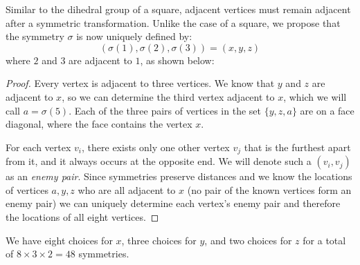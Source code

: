 \begin{sol}
    Similar to the dihedral group of a square, adjacent vertices must remain adjacent after a symmetric transformation. Unlike the case of a square, we propose that the symmetry $\sigma$ is now uniquely defined by:
    \begin{equation}
        (\sigma(1), \sigma(2), \sigma(3)) = (x,y,z)
    \end{equation}
    where $2$ and $3$ are adjacent to $1$, as shown below:
    \begin{center}
    \end{center}
    \begin{proof}
        Every vertex is adjacent to three vertices. We know that $y$ and $z$ are adjacent to $x$, so we can determine the third vertex adjacent to $x$, which we will call $a=\sigma(5)$. Each of the three pairs of vertices in the set $\{y,z,a\}$ are on a face diagonal, where the face contains the vertex $x$.
        \vspace{2mm}

        For each vertex $v_i$, there exists only one other vertex $v_j$ that is the furthest apart from it, and it always occurs at the opposite end. We will denote such a $(v_i,v_j)$ as an \textit{enemy pair}. Since symmetries preserve distances and we know the locations of vertices $a,y,z$ who are all adjacent to $x$ (no pair of the known vertices form an enemy pair) we can uniquely determine each vertex's enemy pair and therefore the locations of all eight vertices.
    \end{proof}
    We have eight choices for $x$, three choices for $y$, and two choices for $z$ for a total of $8\times 3\times 2 = 48$ symmetries.
\end{sol}